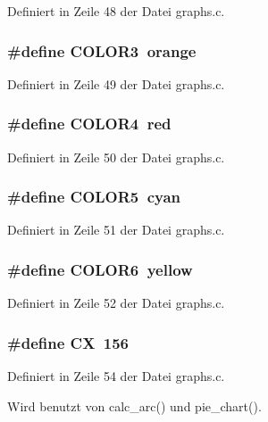 Definiert in Zeile 48 der Datei graphs.c.
\subsubsection{\setlength{\rightskip}{0pt plus 5cm}\#define COLOR3~{\bf orange}}\label{graphs_8c_299edc84540341c664cd7a183e8fc9bd}




Definiert in Zeile 49 der Datei graphs.c.
\subsubsection{\setlength{\rightskip}{0pt plus 5cm}\#define COLOR4~{\bf red}}\label{graphs_8c_5b1074ec004e850c360022e0d433e475}




Definiert in Zeile 50 der Datei graphs.c.
\subsubsection{\setlength{\rightskip}{0pt plus 5cm}\#define COLOR5~{\bf cyan}}\label{graphs_8c_b1b154af4927f41dc0ac230992bf1a15}




Definiert in Zeile 51 der Datei graphs.c.
\subsubsection{\setlength{\rightskip}{0pt plus 5cm}\#define COLOR6~{\bf yellow}}\label{graphs_8c_8fd4fb399b4659d7aed1fcb5cc182ebb}




Definiert in Zeile 52 der Datei graphs.c.
\subsubsection{\setlength{\rightskip}{0pt plus 5cm}\#define CX~156}\label{graphs_8c_0b4c12a5dc8490a3cff8385334db2d13}




Definiert in Zeile 54 der Datei graphs.c.

Wird benutzt von calc\_\-arc() und pie\_\-chart().
